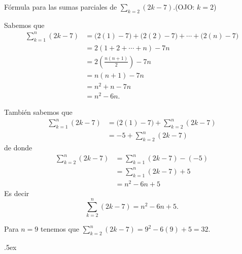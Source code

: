 \documentclass[12pt,letterpaper]{article}
\author{\textsc{Manuel López Mateos}}
\newcommand{\fej}{\relax\hfill\ifmmode{\lower.5ex\hbox{{\textcolor{blue}{\LARGE\smiley al 15pt}}}}\else\lower.5ex\hbox{{\textcolor{blue}{\LARGE \smiley}}}}  %
\begin{document}
Fórmula para las sumas parciales de 
$\displaystyle\sum_{k=2}(2k-7)$.\qquad (OJO: $k=2$)

\bigskip
Sabemos que  
\begin{align*}
\sum_{k=1}^n(2k-7)&=\big(2(1)-7\big)+\big(2(2)-7\big)+\cdots+\big(2(n)-7\big)\\
&=2(1+2+\cdots+n)-7n\\
&=2\left(\frac{n(n+1)}{2}\right)-7n\\
&=n(n+1)-7n\\
&=n^2+n-7n\\
&=n^2-6n.
\end{align*}

También sabemos que
\begin{align*}
\sum_{k=1}^n(2k-7)&=\big(2(1)-7\big)+\sum_{k=2}^n(2k-7)\\
&=-5+\sum_{k=2}^n(2k-7)
\end{align*}
de donde
\begin{align*}
\sum_{k=2}^n(2k-7)&=\sum_{k=1}^n(2k-7)-(-5)\\
&=\sum_{k=1}^n(2k-7)+5\\
&=n^2-6n+5
\end{align*}
Es decir
$$\sum_{k=2}^n(2k-7)=n^2-6n+5.$$

Para $n=9$ tenemos que $\sum_{k=2}^n(2k-7)=9^2-6(9)+5=32$.

\fej
\end{document}
